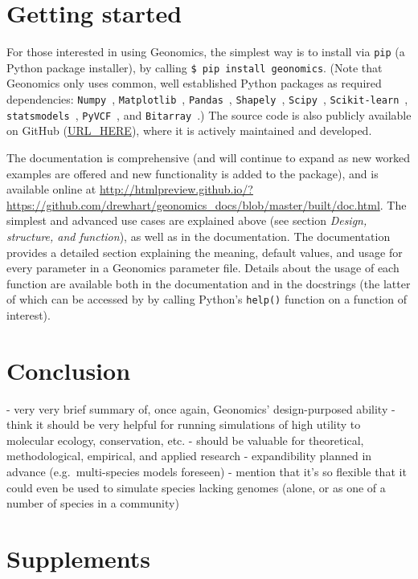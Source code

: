 ﻿\documentclass{article}
\begin{document}
\section{Getting started}
For those interested in using Geonomics, the simplest way is to install
via \texttt{pip} (a Python package installer),
by calling \texttt{\$ pip install geonomics}.
(Note that Geonomics only uses common, well established Python packages
as required dependencies:
\texttt{Numpy}~\cite{numpy},
\texttt{Matplotlib}~\cite{matplotlib},
\texttt{Pandas}~\cite{pandas},
\texttt{Shapely}~\cite{shapely},
\texttt{Scipy}~\cite{scipy},
\texttt{Scikit-learn}~\cite{scikit-learn},
\texttt{statsmodels}~\cite{statsmodels},
\texttt{PyVCF}~\cite{pyvcf},
and \texttt{Bitarray}~\cite{bitarray}.)
The source code is also publicly available on GitHub (\url{URL\_HERE}),
where it is actively maintained and developed.

The documentation is comprehensive (and will continue to expand as new worked examples
are offered and new functionality is added to the package), and is available
online at \url{http://htmlpreview.github.io/?https://github.com/drewhart/geonomics\_docs/blob/master/built/doc.html}.  
The simplest and advanced use cases are explained above (see section
\emph{Design, structure, and function}), as well as in the documentation.
The documentation provides a detailed section explaining the meaning,
default values, and usage for every parameter in a Geonomics parameter file.
Details about the usage of each function are available both in the documentation
and in the docstrings (the latter of which can be accessed by by calling Python's
\texttt{help()} function on a function of interest).


\section{Conclusion}
- very very brief summary of, once again, Geonomics' design-purposed ability
- think it should be very helpful for running simulations of high utility to
  molecular ecology, conservation, etc. 
- should be valuable for theoretical, methodological, empirical, and applied research
- expandibility planned in advance (e.g.\ multi-species models foreseen)
- mention that it's so flexible that it could even be used to simulate species lacking genomes (alone, or as one of a number of species in a community)


\section{Supplements}
\end{document}
